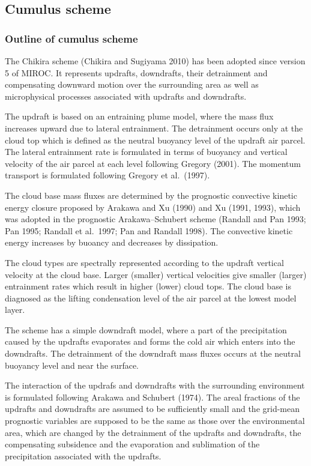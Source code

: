 \hypertarget{cumulus-scheme}{%
\subsection{Cumulus scheme}\label{cumulus-scheme}}

\hypertarget{outline-of-cumulus-scheme}{%
\subsubsection{Outline of cumulus
scheme}\label{outline-of-cumulus-scheme}}

The Chikira scheme (Chikira and Sugiyama 2010) has been adopted since
version 5 of MIROC. It represents updrafts, downdrafts, their
detrainment and compensating downward motion over the surrounding area
as well as microphysical processes associated with updrafts and
downdrafts.

The updraft is based on an entraining plume model, where the mass flux
increases upward due to lateral entrainment. The detrainment occurs only
at the cloud top which is defined as the neutral buoyancy level of the
updraft air parcel. The lateral entrainment rate is formulated in terms
of buoyancy and vertical velocity of the air parcel at each level
following Gregory (2001). The momentum transport is formulated following
Gregory et al.~(1997).

The cloud base mass fluxes are determined by the prognostic convective
kinetic energy closure proposed by Arakawa and Xu (1990) and Xu (1991,
1993), which was adopted in the prognostic Arakawa--Schubert scheme
(Randall and Pan 1993; Pan 1995; Randall et al.~1997; Pan and Randall
1998). The convective kinetic energy increases by buoancy and decreases
by dissipation.

The cloud types are spectrally represented according to the updraft
vertical velocity at the cloud base. Larger (smaller) vertical
velocities give smaller (larger) entrainment rates which result in
higher (lower) cloud tops. The cloud base is diagnosed as the lifting
condensation level of the air parcel at the lowest model layer.

The scheme has a simple downdraft model, where a part of the
precipitation caused by the updrafts evaporates and forms the cold air
which enters into the downdrafts. The detrainment of the downdraft mass
fluxes occurs at the neutral buoyancy level and near the surface.

The interaction of the updrafs and downdrafts with the surrounding
environment is formulated following Arakawa and Schubert (1974). The
areal fractions of the updrafts and downdrafts are assumed to be
sufficiently small and the grid-mean prognostic variables are supposed
to be the same as those over the environmental area, which are changed
by the detrainment of the updrafts and downdrafts, the compensating
subsidence and the evaporation and sublimation of the precipitation
associated with the updrafts.

